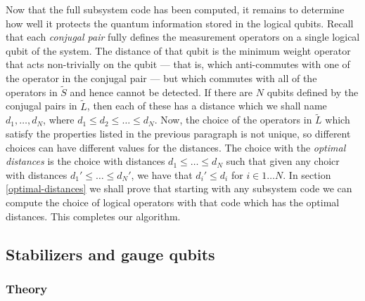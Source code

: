 \documentclass[twocolumn,showpacs,preprintnumbers,amsmath,amssymb,nofootinbib,pra,floatfix]{revtex4}
\begin{document}
Now that the full subsystem code has been computed, it remains to determine how well it protects the quantum information stored in the logical qubits.  Recall that each \emph{conjugal pair} fully defines the measurement operators on a single logical qubit of the system.  The distance of that qubit is the minimum weight operator that acts non-trivially on the qubit --- that is, which anti-commutes with one of the operator in the conjugal pair --- but which commutes with all of the operators in $\tilde S$ and hence cannot be detected.  If there are $N$ qubits defined by the conjugal pairs in $\tilde L$, then each of these has a distance which we shall name $d_1,\dots,d_N$, where $d_1\le d_2 \le \dots \le d_N$.  Now, the choice of the operators in $\tilde L$ which satisfy the properties listed in the previous paragraph is not unique, so different choices can have different values for the distances.  The choice with the \emph{optimal distances} is the choice with distances $d_1\le \dots \le d_N$ such that given any choicr with distances $d_1'\le \dots \le d_N'$, we have that $d_i' \le d_i$ for $i\in 1\dots N$.  In section \ref{optimal-distances} we shall prove that starting with any subsystem code we can compute the choice of logical operators with that code which has the optimal distances.  This completes our algorithm.
\subsection{Stabilizers and gauge qubits}

\label{stabilizers-and-gauge-qubits}
\subsubsection{Theory}
\end{document}
